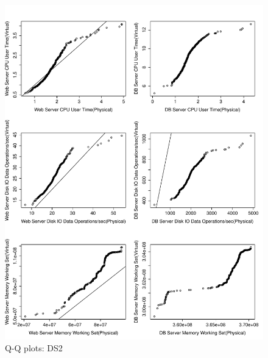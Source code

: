 \begin{figure}[!htbp]
	\centering
	\includegraphics[width=1\textwidth]{ds2_qq.pdf}
	\caption{Q-Q plots: DS2}
	\captionsetup{justification=centering}
	\label{fig:Results Table}
\end{figure}

